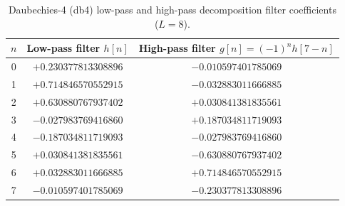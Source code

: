 \documentclass[12pt,a4paper,oneside]{report}
\begin{document}
\begin{table}[H]\centering\caption{Daubechies-4 (db4) low-pass and high-pass decomposition filter coefficients ($L=8$).}\label{tab:A.1}
\begin{tabular}{@{}ccc@{}}\toprule
$n$ & Low-pass filter $h[n]$ & High-pass filter $g[n] = (-1)^n h[7-n]$\\ \midrule
0 & $+0.230377813308896$ & $-0.010597401785069$\\
1 & $+0.714846570552915$ & $-0.032883011666885$\\
2 & $+0.630880767937402$ & $+0.030841381835561$\\
3 & $-0.027983769416860$ & $+0.187034811719093$\\
4 & $-0.187034811719093$ & $-0.027983769416860$\\
5 & $+0.030841381835561$ & $-0.630880767937402$\\
6 & $+0.032883011666885$ & $+0.714846570552915$\\
7 & $-0.010597401785069$ & $-0.230377813308896$\\ \bottomrule
\end{tabular}\end{table}
\end{document}
